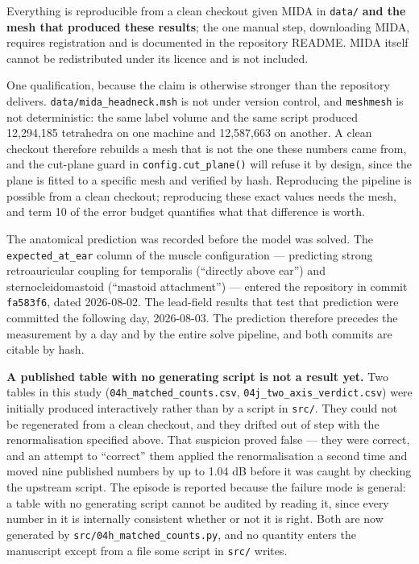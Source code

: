 \documentclass[
  11pt,
  letterpaper,
]{article}
\begin{document}
Everything is reproducible from a clean checkout given MIDA in \texttt{data/} \textbf{and the mesh that produced these results}; the one
manual step, downloading MIDA, requires registration and is documented in the
repository README. MIDA itself cannot be redistributed under its licence and is
not included.

One qualification, because the claim is otherwise stronger than the repository
delivers. \texttt{data/mida\_headneck.msh} is not under version control, and \texttt{meshmesh}
is not deterministic: the same label volume and the same script produced
12,294,185 tetrahedra on one machine and 12,587,663 on another. A clean checkout
therefore rebuilds a mesh that is not the one these numbers came from, and the
cut-plane guard in \texttt{config.cut\_plane()} will refuse it by design, since the
plane is fitted to a specific mesh and verified by hash. Reproducing the
pipeline is possible from a clean checkout; reproducing these exact values needs
the mesh, and term 10 of the error budget quantifies what that difference is
worth.

The anatomical prediction was recorded before the model was solved. The
\texttt{expected\_at\_ear} column of the muscle configuration --- predicting strong
retroauricular coupling for temporalis (``directly above ear'') and
sternocleidomastoid (``mastoid attachment'') --- entered the repository in commit
\texttt{fa583f6}, dated 2026-08-02. The lead-field results that test that prediction
were committed the following day, 2026-08-03. The prediction therefore precedes
the measurement by a day and by the entire solve pipeline, and both commits are
citable by hash.

\textbf{A published table with no generating script is not a result yet.} Two tables
in this study (\texttt{04h\_matched\_counts.csv}, \texttt{04j\_two\_axis\_verdict.csv}) were
initially produced interactively rather than by a script in \texttt{src/}. They could
not be regenerated from a clean checkout, and they drifted out of step with the
renormalisation specified above. That suspicion proved false --- they were
correct, and an attempt to ``correct'' them applied the renormalisation a second
time and moved nine published numbers by up to 1.04 dB before it was caught by
checking the upstream script. The episode is reported because the failure mode
is general: a table with no generating script cannot be audited by reading it,
since every number in it is internally consistent whether or not it is right.
Both are now generated by \texttt{src/04h\_matched\_counts.py}, and no quantity enters
the manuscript except from a file some script in \texttt{src/} writes.
\end{document}
